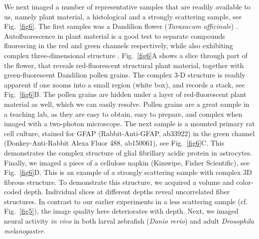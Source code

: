 \documentclass[10pt,letterpaper]{article}
\begin{document}
We next imaged a number of representative samples that are readily available to us, namely plant material, a histological and a strongly scattering sample, see Fig.~\ref{fig6}. The first samples was a Dandilion flower (\textit{Taraxacum officinale}) \cite{Rupprecht2018}. Autofluorescence in plant material is a good test to separate compounds fluorescing in the red and green channels respectively, while also exhibiting complex three-dimensional structure \cite{Cheung2010, Nguyen2001}. Fig.~\ref{fig6}A shows a slice through part of the flower, that reveals red-fluorescent structural plant material, together with green-fluorescent Dandilion pollen grains. The complex 3-D structure is readily apparent if one zooms into a small region (white box), and records a stack, see Fig.~\ref{fig6}B. The pollen grains are hidden under a layer of red-fluorescent plant material as well, which we can easily resolve. Pollen grains are a great sample in a teaching lab, as they are easy to obtain, easy to prepare, and complex when imaged with a two-photon microscope\cite{Rupprecht2018}. The next sample is a mounted primary rat cell culture\cite{Schottdorf2018}, stained for GFAP (Rabbit-Anti-GFAP, ab33922) in the green channel (Donkey-Anti-Rabbit Alexa Fluor 488, ab150061), see Fig.~\ref{fig6}C. This demonstrates the complex structure of glial fibrillary acidic protein in astrocytes. Finally, we imaged a piece of a cellulose napkin (Kimwipe, Fisher Scientific), see Fig.~\ref{fig6}D. This is an example of a strongly scattering sample with complex 3D fibrous structure. To demonstrate this structure, we acquired a volume and color-coded depth. Individual slices at different depths reveal uncorrelated fiber structures. In contrast to our earlier experiments in a less scattering sample (cf. Fig.~\ref{fig5}), the image quality here deteriorates with depth.\newline
Next, we imaged neural activity \textit{in vivo} in both larval zebrafish (\textit{Danio rerio}) and adult \textit{Drosophila melanogaster}. 
%
\end{document}
